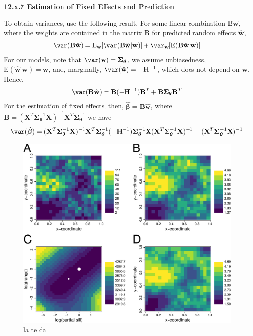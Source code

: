 \documentclass[12pt, titlepage]{article}
\begin{document}
\vspace{.5cm}
{\large \flushleft \textbf{12.x.7 Estimation of Fixed Effects and Prediction}}
\vspace{.5cm}


To obtain variances, use the following result.  For some linear combination $\mathbf{B}\hat{\mathbf{w}}$, where the weights are contained in the matrix $\mathbf{B}$ for predicted random effects $\hat{\mathbf{w}}$, 
$$
\var(\mathbf{B}\hat{\mathbf{w}}) = \textrm{E}_{\mathbf{w}}[\var(\mathbf{B}\hat{\mathbf{w}}|\mathbf{w})] + \var_{\mathbf{w}}[\textrm{E}(\mathbf{B}\hat{\mathbf{w}}|\mathbf{w})]
$$
For our models, note that $\var(\mathbf{w}) = \boldsymbol{\Sigma_{\boldsymbol{\theta}}}$, we assume unbiasedness, $\textrm{E}(\hat{\mathbf{w}}|\mathbf{w}) = \mathbf{w}$, and, marginally, $\var(\hat{\mathbf{w}}) = -\mathbf{H}^{-1}$, which does not depend on $\mathbf{w}$.  Hence,
$$
\var(\mathbf{B}\hat{\mathbf{w}}) = \mathbf{B}(-\mathbf{H}^{-1})\mathbf{B}^{T} + \mathbf{B}\boldsymbol{\Sigma_{\boldsymbol{\theta}}}\mathbf{B}^{T}
$$ 
For the estimation of fixed effects, then, $\hat{\boldsymbol{\beta}} = \mathbf{B}\hat{\mathbf{w}}$, where $\mathbf{B} = (\mathbf{X}^{T}\boldsymbol{\Sigma}_{\boldsymbol{\theta}}^{-1}\mathbf{X})^{-1}\mathbf{X}^{T}\boldsymbol{\Sigma}_{\boldsymbol{\theta}}^{-1}$ we have
$$
\var(\hat{\boldsymbol{\beta}}) = (\mathbf{X}^{T}\boldsymbol{\Sigma}_{\boldsymbol{\theta}}^{-1}\mathbf{X})^{-1}\mathbf{X}^{T}\boldsymbol{\Sigma}_{\boldsymbol{\theta}}^{-1}(-\mathbf{H}^{-1})\boldsymbol{\Sigma}_{\boldsymbol{\theta}}^{-1}\mathbf{X}(\mathbf{X}^{T}\boldsymbol{\Sigma}_{\boldsymbol{\theta}}^{-1}\mathbf{X})^{-1} + (\mathbf{X}^{T}\boldsymbol{\Sigma}_{\boldsymbol{\theta}}^{-1}\mathbf{X})^{-1}
$$
\begin{figure}[H]
  \begin{center}
	    \includegraphics[width=.8\linewidth]{figures/sglm_likelihood_estimation}
  \end{center}
  \caption{la te da \label{Fig:sglm_likelihood_estimation}}
\end{figure}
\end{document}

